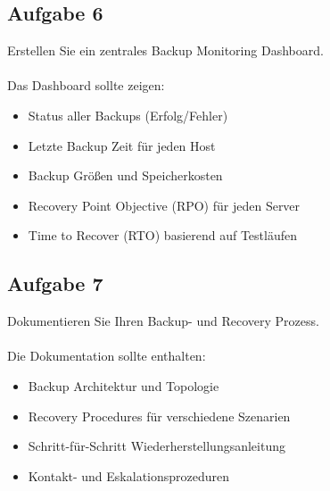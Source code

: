 \documentclass{article}
\begin{document}
    \subsection{Aufgabe 6}
    Erstellen Sie ein zentrales Backup Monitoring Dashboard.
    \\ \\
    Das Dashboard sollte zeigen:
    \begin{itemize}
        \item Status aller Backups (Erfolg/Fehler)
        \item Letzte Backup Zeit für jeden Host
        \item Backup Größen und Speicherkosten
        \item Recovery Point Objective (RPO) für jeden Server
        \item Time to Recover (RTO) basierend auf Testläufen
    \end{itemize}

    \subsection{Aufgabe 7}
    Dokumentieren Sie Ihren Backup- und Recovery Prozess.
    \\ \\
    Die Dokumentation sollte enthalten:
    \begin{itemize}
        \item Backup Architektur und Topologie
        \item Recovery Procedures für verschiedene Szenarien
        \item Schritt-für-Schritt Wiederherstellungsanleitung
        \item Kontakt- und Eskalationsprozeduren
    \end{itemize}
\end{document}
